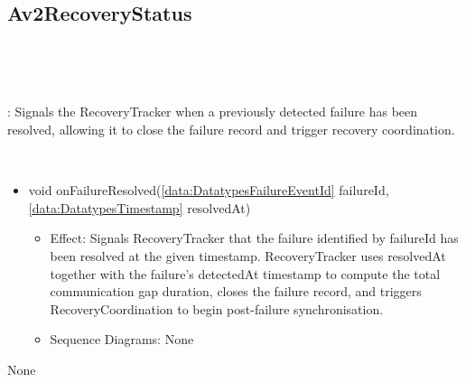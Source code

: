   \subsection{Av2RecoveryStatus}\label{int:InterfacesAv2RecoveryStatus}
    \begin{description}
      \item[Provided by:] \iconcomponent{}~
      \item[Required by:] \iconcomponent{}~ 
           \item[Description]: Signals the RecoveryTracker when a previously detected failure has been resolved, allowing it to close the failure record and trigger recovery coordination.
      \item[Operations:] ~
    \begin{itemize}[noitemsep,nolistsep,leftmargin=-.25cm]
      \item \textsf{void onFailureResolved(\ref{data:DatatypesFailureEventId} failureId, \ref{data:DatatypesTimestamp} resolvedAt)}
        \begin{itemize}[noitemsep,nolistsep]
           \item Effect: Signals RecoveryTracker that the failure identified by failureId has been resolved at the given timestamp. RecoveryTracker uses resolvedAt together with the failure's detectedAt timestamp to compute the total communication gap duration, closes the failure record, and triggers RecoveryCoordination to begin post-failure synchronisation. 
           \item Sequence Diagrams: None
        \end{itemize}
    \end{itemize}
      \item[Diagrams:] None
    \end{description}

